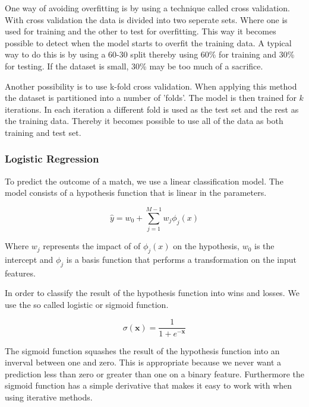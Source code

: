One way of avoiding overfitting is by using a technique called cross validation.
With cross validation the data is divided into two seperate sets.
Where one is used for training and the other to test for overfitting. 
This way it becomes possible to detect when the model starts to overfit the training data.
A typical way to do this is by using a 60-30 split thereby using 60\% for training and 30\% for testing.
If the dataset is small, 30\% may be too much of a sacrifice.

Another possibility is to use k-fold cross validation.
When applying this method the dataset is partitioned into a number of 'folds'.
The model is then trained for $k$ iterations.
In each iteration a different fold is used as the test set and the rest as the training data.
Thereby it becomes possible to use all of the data as both training and test set.

\begin{flushright}
\cite[p. 324]{AI2010}
\end{flushright}

\subsubsection{Logistic Regression}\label{sec:logistic}
To predict the outcome of a match, we use a linear classification model.
The model consists of a hypothesis function that is linear in the parameters.

\[ \hat{y} = w_0 + \sum_{j=1}^{M-1} w_j \phi_j(x) \]

Where $w_j$ represents the impact of of $\phi_j(x)$ on the hypothesis,
$w_0$ is the intercept and $\phi_j$ is a basis function that
performs a transformation on the input features. 


In order to classify the result of the hypothesis function into wins and losses. 
We use the so called logistic or sigmoid function.

\[ \sigma(\textbf{x}) = \frac{1}{1+e^{- \textbf{x}}} \]

The sigmoid function squashes the result of the hypothesis function into an inverval between one and zero.
This is appropriate because we never want a prediction less than zero or greater than one on a binary feature.
Furthermore the sigmoid function has a simple derivative that makes it easy to work with when using iterative methods.


